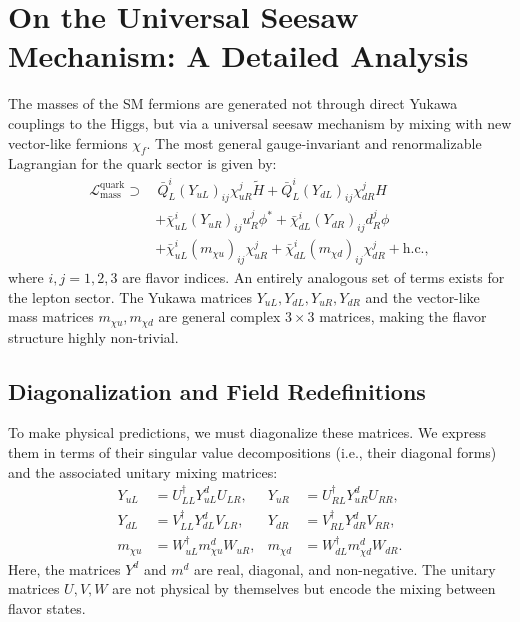 \chapter{On the Universal Seesaw Mechanism: A Detailed Analysis}\label{app:universal_seesaw}

The masses of the SM fermions are generated not through direct Yukawa couplings to the Higgs, but via a universal seesaw mechanism by mixing with new vector-like fermions $\chi_f$. The most general gauge-invariant and renormalizable Lagrangian for the quark sector is given by:
\begin{align}
\mathcal{L}_{\text{mass}}^{\text{quark}} \supset & \, \bar{Q}_{L}^{i} (Y_{u L})_{ij} \chi_{u R}^{j} \tilde{H} + \bar{Q}_{L}^{i} (Y_{d L})_{ij} \chi_{d R}^{j} H \nonumber \\
& + \bar{\chi}_{u L}^{i} (Y_{u R})_{ij} u_{R}^{j} \phi^{*} + \bar{\chi}_{d L}^{i} (Y_{d R})_{ij} d_{R}^{j} \phi \nonumber \\
& + \bar{\chi}_{u L}^{i} (m_{\chi u})_{ij} \chi_{u R}^{j} + \bar{\chi}_{d L}^{i} (m_{\chi d})_{ij} \chi_{d R}^{j} + \text{h.c.}, \label{eq:L_Yuk_general_detail}
\end{align}
where $i, j = 1,2,3$ are flavor indices. An entirely analogous set of terms exists for the lepton sector. The Yukawa matrices $Y_{uL}, Y_{dL}, Y_{uR}, Y_{dR}$ and the vector-like mass matrices $m_{\chi u}, m_{\chi d}$ are general complex $3 \times 3$ matrices, making the flavor structure highly non-trivial.

\section{Diagonalization and Field Redefinitions}
To make physical predictions, we must diagonalize these matrices. We express them in terms of their singular value decompositions (i.e., their diagonal forms) and the associated unitary mixing matrices:
\begin{align*}
Y_{u L} &= U_{L L}^{\dagger} Y_{u L}^{d} U_{L R}, & Y_{u R} &= U_{R L}^{\dagger} Y_{u R}^{d} U_{R R}, \\
Y_{d L} &= V_{L L}^{\dagger} Y_{d L}^{d} V_{L R}, & Y_{d R} &= V_{R L}^{\dagger} Y_{d R}^{d} V_{R R}, \\
m_{\chi u} &= W_{u L}^{\dagger} m_{\chi u}^{d} W_{u R}, & m_{\chi d} &= W_{d L}^{\dagger} m_{\chi d}^{d} W_{d R}.
\end{align*}
Here, the matrices $Y^{d}$ and $m^{d}$ are real, diagonal, and non-negative. The unitary matrices $U, V, W$ are not physical by themselves but encode the mixing between flavor states.

